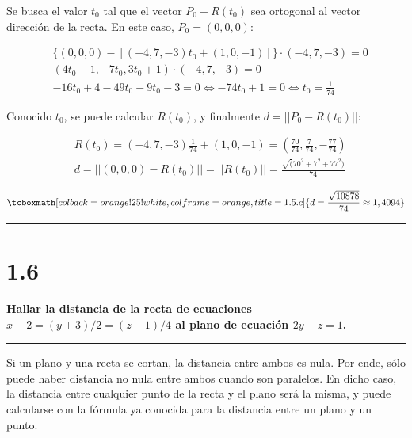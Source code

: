 \documentclass{article}
\begin{document}
Se busca el valor $t_0$ tal que el vector $P_0 - R(t_0)$ sea ortogonal al vector dirección de la recta. En este caso, $P_0 = (0, 0, 0)$:

\begin{subequations}
\begin{align}
& \{(0, 0, 0) - [(-4, 7, -3) t_0 + (1, 0, -1)]\} \cdot (-4, 7, -3) = 0 \\
& (4 t_0 - 1, -7 t_0, 3 t_0 + 1) \cdot (-4, 7, -3) = 0 \\
& -16 t_0 + 4 -49 t_0 -9 t_0 -3 = 0 \Leftrightarrow -74 t_0 + 1 = 0 \Leftrightarrow t_0 = \frac{1}{74} 
\end{align}
\end{subequations}

Conocido $t_0$, se puede calcular $R(t_0)$, y finalmente $d = ||P_0 - R(t_0)||$:

\begin{subequations}
\begin{align}
& R(t_0) = (-4, 7, -3) \frac{1}{74} + (1, 0, -1) = \left( \frac{70}{74}, \frac{7}{74}, -\frac{77}{74} \right) \\
& d = ||(0,0,0) - R(t_0)|| = ||R(t_0)|| = \frac{\sqrt(70^2 + 7^2 + 77^2)}{74}
\end{align}
\end{subequations}

\begin{equation}
\tcboxmath[colback=orange!25!white,colframe=orange,title=1.5.c]
{ d = \frac{\sqrt{10878}}{74} \approx 1,4094 }
\end{equation}

\hrule
\vspace{10 pt}

\section*{1.6}
\label{sec:1.6}

\textbf{Hallar la distancia de la recta de ecuaciones $x - 2 = (y + 3)/2 = (z-1)/4$ al plano de ecuación $2y -z = 1$.} 
\vspace{10 pt}
\hrule
\vspace{10 pt}

Si un plano y una recta se cortan, la distancia entre ambos es nula. Por ende, sólo puede haber distancia no nula entre ambos cuando son paralelos. En dicho caso, la distancia entre cualquier punto de la recta y el plano será la misma, y puede calcularse con la fórmula ya conocida para la distancia entre un plano y un punto.
\end{document}
